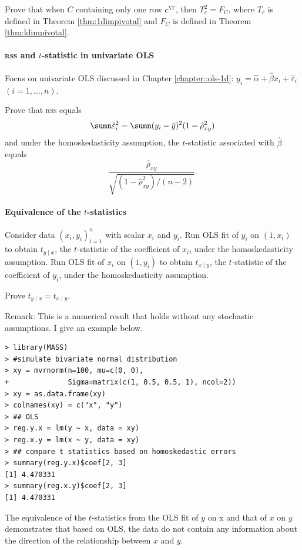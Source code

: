 Prove that when $C$ containing only one row $c^{\T}$, then $T_c^2 = F_C$, where $T_c$ is defined in Theorem \ref{thm:1dimpivotal} and $F_C$ is defined in Theorem \ref{thm:ldimpivotal}. 

 

 

\paragraph{\textsc{rss} and $t$-statistic in univariate OLS}\label{hw5::t-ratio-univariateOLS}


Focus on univariate OLS discussed in Chapter \ref{chapter::ols-1d}: $y_i = \hat{\alpha}  +  \hat{\beta} x_i + \hat{\varepsilon}_i$ $(i=1,\ldots, n)$. 

Prove that \textsc{rss}  equals
$$
\sumn \hat{\varepsilon}_i^2 = \sumn (y_i -  \bar{y}  )^2 (1- \hat{\rho}_{xy} ^2)
$$ 
and under the homoskedasticity assumption, the $t$-statistic associated with $ \hat{\beta}$ equals
$$
\frac{  \hat{\rho}_{xy}   }{  \sqrt{    (1-\hat{\rho}_{xy} ^2) /(n-2)  }   }.
$$




\paragraph{Equivalence of the $t$-statistics}\label{hw5::t-stat-equivalent}



Consider data $(x_i, y_i)_{i=1}^n$ with scalar $x_i$ and $y_i$. Run OLS fit of $y_i$ on $(1,x_i)$ to obtain $t_{y\mid x}$, the $t$-statistic of the coefficient of $x_i$, under the homoskedasticity assumption. Run OLS fit of $x_i$ on $(1,y_i)$ to obtain $t_{x\mid y}$, the $t$-statistic of the coefficient of $y_i$, under the homoskedasticity assumption. 

Prove $t_{y\mid x} = t_{x\mid y}$.

Remark: This is a numerical result that holds without any stochastic assumptions. I give an example below.

\begin{lstlisting}
> library(MASS)
> #simulate bivariate normal distribution
> xy = mvrnorm(n=100, mu=c(0, 0), 
+              Sigma=matrix(c(1, 0.5, 0.5, 1), ncol=2))
> xy = as.data.frame(xy)
> colnames(xy) = c("x", "y")
> ## OLS
> reg.y.x = lm(y ~ x, data = xy)
> reg.x.y = lm(x ~ y, data = xy)
> ## compare t statistics based on homoskedastic errors
> summary(reg.y.x)$coef[2, 3]
[1] 4.470331
> summary(reg.x.y)$coef[2, 3]
[1] 4.470331
\end{lstlisting}
The equivalence of the $t$-statistics from the OLS fit of $y$ on x and that of $x$ on $y$ demonstrates that based on OLS, the data do not contain any information about the direction of the relationship between $x$ and $y$. 

